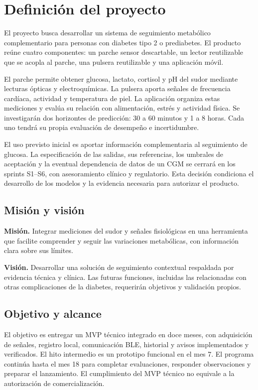 \section{Definición del proyecto}
El proyecto busca desarrollar un sistema de seguimiento metabólico complementario para personas con diabetes tipo 2 o prediabetes. El producto reúne cuatro componentes: un parche sensor descartable, un lector reutilizable que se acopla al parche, una pulsera reutilizable y una aplicación móvil.

El parche permite obtener glucosa, lactato, cortisol y pH del sudor mediante lecturas ópticas y electroquímicas. La pulsera aporta señales de frecuencia cardíaca, actividad y temperatura de piel. La aplicación organiza estas mediciones y evalúa su relación con alimentación, estrés y actividad física. Se investigarán dos horizontes de predicción: 30 a 60 minutos y 1 a 8 horas. Cada uno tendrá su propia evaluación de desempeño e incertidumbre.

El uso previsto inicial es aportar información complementaria al seguimiento de glucosa. La especificación de las salidas, sus referencias, los umbrales de aceptación y la eventual dependencia de datos de un CGM se cerrará en los sprints S1--S6, con asesoramiento clínico y regulatorio. Esta decisión condiciona el desarrollo de los modelos y la evidencia necesaria para autorizar el producto.

\subsection{Misión y visión}
\noindent\textbf{Misión.} Integrar mediciones del sudor y señales fisiológicas en una herramienta que facilite comprender y seguir las variaciones metabólicas, con información clara sobre sus límites.

\noindent\textbf{Visión.} Desarrollar una solución de seguimiento contextual respaldada por evidencia técnica y clínica. Las futuras funciones, incluidas las relacionadas con otras complicaciones de la diabetes, requerirán objetivos y validación propios.

\subsection{Objetivo y alcance}
El objetivo es entregar un MVP técnico integrado en doce meses, con adquisición de señales, registro local, comunicación BLE, historial y avisos implementados y verificados. El hito intermedio es un prototipo funcional en el mes 7. El programa continúa hasta el mes 18 para completar evaluaciones, responder observaciones y preparar el lanzamiento. El cumplimiento del MVP técnico no equivale a la autorización de comercialización.

